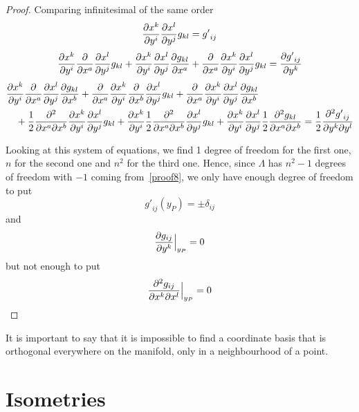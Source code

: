 \begin{proof}
        Comparing infinitesimal of the same order
        \begin{equation*}
            \frac{\partial x^k}{\partial y^i} \frac{\partial x^l}{\partial y^j} g_{kl} = {g'}_{ij}
        \end{equation*}
        \begin{equation*}
            \frac{\partial x^k}{\partial y^i} \frac{\partial}{\partial x^a} \frac{\partial x^l}{\partial y^j} g_{kl} + \frac{\partial x^k}{\partial y^i} \frac{\partial x^l}{\partial y^j} \frac{\partial g_{kl}}{\partial x^a} + \frac{\partial}{\partial x^a} \frac{\partial x^k}{\partial y^i} \frac{\partial x^l}{\partial y^j} g_{kl} = \frac{\partial{g'}_{ij}}{\partial y^k}
        \end{equation*}
        \begin{equation*}
        \begin{aligned}
            & \frac{\partial x^k}{\partial y^i} \frac{\partial}{\partial x^a} \frac{\partial x^l}{\partial y^j} \frac{\partial g_{kl}}{\partial x^b}
            + \frac{\partial}{\partial x^a} \frac{\partial x^k}{\partial y^i}\frac{\partial}{\partial x^b} \frac{\partial x^l}{\partial y^j} g_{kl}
            + \frac{\partial}{\partial x^a} \frac{\partial x^k}{\partial y^i} \frac{\partial x^l}{\partial y^j} \frac{\partial g_{kl}}{\partial x^b} \\ & \quad + \frac{1}{2} \frac{\partial^2 }{\partial x^a \partial x^b} \frac{\partial x^k}{\partial y^i} \frac{\partial x^l}{\partial y^j} g_{kl} 
            + \frac{\partial x^k}{\partial y^i} \frac{1}{2} \frac{\partial^2 }{\partial x^a \partial x^b} \frac{\partial x^l}{\partial y^j} g_{kl}
            + \frac{\partial x^k}{\partial y^i} \frac{\partial x^l}{\partial y^j} \frac{1}{2} \frac{\partial^2 g_{kl}}{\partial x^a \partial x^b} = \frac{1}{2} \frac{\partial^2 {g'}_{ij}}{\partial y^k \partial y^l}
        \end{aligned}
        \end{equation*}

        Looking at this system of equations, we find 1 degree of freedom for the first one, $n$ for the second one and $n^2$ for the third one. Hence, since $\Lambda$ has $n^2 - 1$ degrees of freedom with $-1$ coming from~\eqref{proof8}, we only have enough degree of freedom to put 
        \begin{equation*}
            {g'}_{ij} (y_P) = \pm \delta_{ij}
        \end{equation*}
        and 
        \begin{equation*}
            \frac{\partial g_{ij}}{\partial y^k} \Big\vert_{y_P} = 0
        \end{equation*}
        but not enough to put 
        \begin{equation*}
            \frac{\partial^2 g_{ij}}{\partial x^k \partial x^l} \Big\vert_{y_P} = 0
        \end{equation*}
    \end{proof}

    It is important to say that it is impossible to find a coordinate basis that is orthogonal everywhere on the manifold, only in a neighbourhood of a point.

\section{Isometries}

